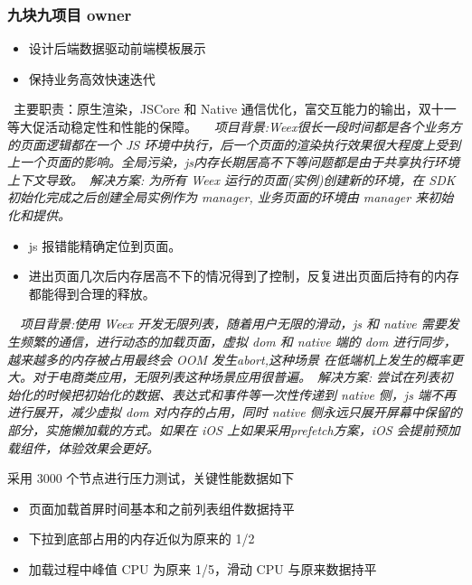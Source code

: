 \documentclass{resume}
\begin{document}
\subsubsection*{九块九项目 owner}
\begin{onehalfspacing}
  \begin{itemize}
    \item 设计后端数据驱动前端模板展示
    \item 保持业务高效快速迭代
  \end{itemize}
\end{onehalfspacing}


\
主要职责：原生渲染，JSCore 和 Native 通信优化，富交互能力的输出，双十一等大促活动稳定性和性能的保障。
\
\
\textit{项目背景:Weex很长一段时间都是各个业务方的页面逻辑都在一个 JS 环境中执行，后一个页面的渲染执行效果很大程度上受到上一个页面的影响。全局污染，js内存长期居高不下等问题都是由于共享执行环境上下文导致。}\
\textit{解决方案: 为所有 Weex 运行的页面(实例)创建新的环境，在 SDK 初始化完成之后创建全局实例作为 manager, 业务页面的环境由 manager 来初始化和提供。}

\begin{itemize}
  \item js 报错能精确定位到页面。
  \item 进出页面几次后内存居高不下的情况得到了控制，反复进出页面后持有的内存都能得到合理的释放。
\end{itemize}


\
\
\textit{项目背景:使用 Weex 开发无限列表，随着用户无限的滑动，js 和 native 需要发生频繁的通信，进行动态的加载页面，虚拟 dom 和 native 端的 dom 进行同步，越来越多的内存被占用最终会 OOM 发生abort,这种场景 在低端机上发生的概率更大。对于电商类应用，无限列表这种场景应用很普遍。}\
\textit{解决方案: 尝试在列表初始化的时候把初始化的数据、表达式和事件等一次性传递到 native 侧，js 端不再进行展开，减少虚拟 dom 对内存的占用，同时 native 侧永远只展开屏幕中保留的部分，实施懒加载的方式。如果在 iOS 上如果采用prefetch方案，iOS 会提前预加载组件，体验效果会更好。}

采用 3000 个节点进行压力测试，关键性能数据如下
\begin{itemize}
  \item 页面加载首屏时间基本和之前列表组件数据持平
  \item 下拉到底部占用的内存近似为原来的 1/2
  \item 加载过程中峰值 CPU 为原来 1/5，滑动 CPU 与原来数据持平
\end{itemize}
\end{document}
